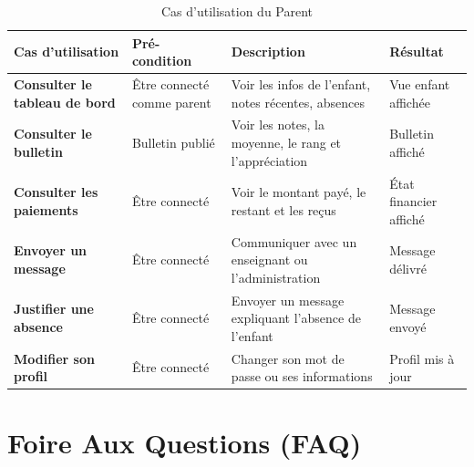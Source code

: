 \documentclass[12pt, a4paper, twoside, openright]{report}
\begin{document}
\begin{table}[htbp]
  \centering
  \caption{Cas d'utilisation du Parent}
  \small
  \begin{tabularx}{\textwidth}{>{\bfseries}p{3.5cm} p{3cm} X p{2.5cm}}
    \toprule
    \textbf{Cas d'utilisation} & \textbf{Pré-condition} & \textbf{Description} & \textbf{Résultat} \\
    \midrule
    Consulter le tableau de bord & Être connecté comme parent & Voir les infos de l'enfant, notes récentes, absences & Vue enfant affichée \\
    Consulter le bulletin & Bulletin publié & Voir les notes, la moyenne, le rang et l'appréciation & Bulletin affiché \\
    Consulter les paiements & Être connecté & Voir le montant payé, le restant et les reçus & État financier affiché \\
    Envoyer un message & Être connecté & Communiquer avec un enseignant ou l'administration & Message délivré \\
    Justifier une absence & Être connecté & Envoyer un message expliquant l'absence de l'enfant & Message envoyé \\
    Modifier son profil & Être connecté & Changer son mot de passe ou ses informations & Profil mis à jour \\
    \bottomrule
  \end{tabularx}
\end{table}


\chapter{Foire Aux Questions (FAQ)}
\label{chap:faq}
\end{document}
